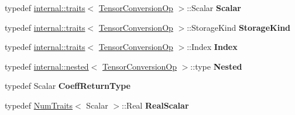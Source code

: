 \begin{DoxyCompactItemize}
typedef \hyperlink{struct_eigen_1_1internal_1_1traits}{internal\+::traits}$<$ \hyperlink{class_eigen_1_1_tensor_conversion_op}{Tensor\+Conversion\+Op} $>$\+::Scalar {\bfseries Scalar}
\item 
\mbox{\label{class_eigen_1_1_tensor_conversion_op_a41fcb6a201998f6d1bbc9070445df9ff}} 
typedef \hyperlink{struct_eigen_1_1internal_1_1traits}{internal\+::traits}$<$ \hyperlink{class_eigen_1_1_tensor_conversion_op}{Tensor\+Conversion\+Op} $>$\+::Storage\+Kind {\bfseries Storage\+Kind}
\item 
\mbox{\label{class_eigen_1_1_tensor_conversion_op_ac7c68058d4475ca4b84ae9e8a3f376e0}} 
typedef \hyperlink{struct_eigen_1_1internal_1_1traits}{internal\+::traits}$<$ \hyperlink{class_eigen_1_1_tensor_conversion_op}{Tensor\+Conversion\+Op} $>$\+::Index {\bfseries Index}
\item 
\mbox{\label{class_eigen_1_1_tensor_conversion_op_af18f9121fee79ffa57fbe69befea605b}} 
typedef \hyperlink{struct_eigen_1_1internal_1_1nested}{internal\+::nested}$<$ \hyperlink{class_eigen_1_1_tensor_conversion_op}{Tensor\+Conversion\+Op} $>$\+::type {\bfseries Nested}
\item 
\mbox{\label{class_eigen_1_1_tensor_conversion_op_a82e8ed75416e8661a7106e064cb48196}} 
typedef Scalar {\bfseries Coeff\+Return\+Type}
\item 
\mbox{\label{class_eigen_1_1_tensor_conversion_op_a5d80c004750e3460cbbe41aeb4b86672}} 
typedef \hyperlink{group___core___module_struct_eigen_1_1_num_traits}{Num\+Traits}$<$ Scalar $>$\+::Real {\bfseries Real\+Scalar}
\end{DoxyCompactItemize}
